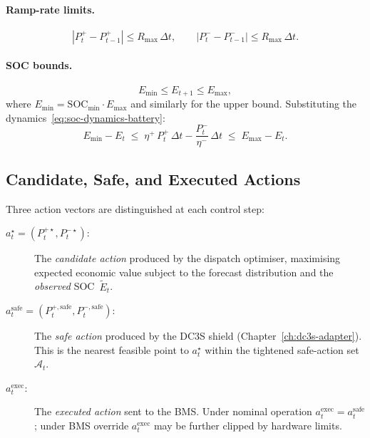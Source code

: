 \paragraph{Ramp-rate limits.}
\begin{equation}
\label{eq:ramp-limits}
  |P_t^{+} - P_{t-1}^{+}| \le R_{\max}\,\Delta t, \qquad
  |P_t^{-} - P_{t-1}^{-}| \le R_{\max}\,\Delta t.
\end{equation}

\paragraph{SOC bounds.}
\begin{equation}
\label{eq:soc-bounds}
  E_{\min} \le E_{t+1} \le E_{\max},
\end{equation}
where $E_{\min} = \mathrm{SOC}_{\min} \cdot E_{\max}$ and similarly for the
upper bound.  Substituting the dynamics~\eqref{eq:soc-dynamics-battery}:
\begin{equation}
\label{eq:soc-bounds-expanded}
  E_{\min} - E_t \;\le\;
    \eta^{+}\,P_t^{+}\,\Delta t - \frac{P_t^{-}}{\eta^{-}}\,\Delta t
  \;\le\; E_{\max} - E_t.
\end{equation}

\subsection{Candidate, Safe, and Executed Actions}

Three action vectors are distinguished at each control step:

\begin{description}
  \item[$a_t^\star = (P_t^{+\star}, P_t^{-\star})$:]
    The \emph{candidate action} produced by the dispatch optimiser, maximising
    expected economic value subject to the forecast distribution and the
    \emph{observed} SOC~$\tilde{E}_t$.

  \item[$a_t^{\mathrm{safe}} = (P_t^{+,\mathrm{safe}}, P_t^{-,\mathrm{safe}})$:]
    The \emph{safe action} produced by the DC3S shield
    (Chapter~\ref{ch:dc3s-adapter}).  This is the nearest feasible point to
    $a_t^\star$ within the tightened safe-action set~$\mathcal{A}_t$.

  \item[$a_t^{\mathrm{exec}}$:]
    The \emph{executed action} sent to the BMS.  Under nominal operation
    $a_t^{\mathrm{exec}} = a_t^{\mathrm{safe}}$; under BMS override
    $a_t^{\mathrm{exec}}$ may be further clipped by hardware limits.
\end{description}

